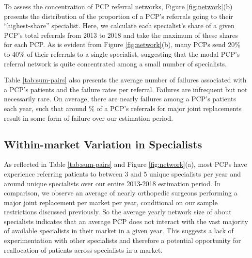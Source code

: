 \documentclass[12pt]{article}
\begin{document}
To assess the concentration of PCP referral networks, Figure \ref{fig:network}(b) presents the distribution of the proportion of a PCP's referrals going to their ``highest-share'' specialist. Here, we calculate each specialist's share of a given PCP's total referrals from 2013 to 2018 and take the maximum of these shares for each PCP. As is evident from Figure \ref{fig:network}(b), many PCPs send 20\% to 40\% of their referrals to a single specialist, suggesting that the modal PCP's referral network is quite concentrated among a small number of specialists.

Table \ref{tab:sum-pairs} also presents the average number of failures associated with a PCP's patients and the failure rates per referral. Failures are infrequent but not necessarily rare. On average, there are nearly \meanFailuresPerPCP{} failures among a PCP's patients each year, such that around \failureRateMean{}\% of a PCP's referrals for major joint replacements result in some form of failure over our estimation period.

\subsection{Within-market Variation in Specialists}
\label{sec:iqr}

As reflected in Table \ref{tab:sum-pairs} and Figure \ref{fig:network}(a), most PCPs have experience referring patients to between 3 and 5 unique specialists per year and around \cumlNetworkSize{} unique specialists over our entire 2013-2018 estimation period. In comparison, we observe an average of nearly \specsPerHRRYear{} orthopedic surgeons performing a major joint replacement per market per year, conditional on our sample restrictions discussed previously. So the average yearly network size of about \meanSpecsPerPCP{} specialists indicates that an average PCP does not interact with the vast majority of available specialists in their market in a given year. This suggests a lack of experimentation with other specialists and therefore a potential opportunity for reallocation of patients across specialists in a market.
\end{document}

